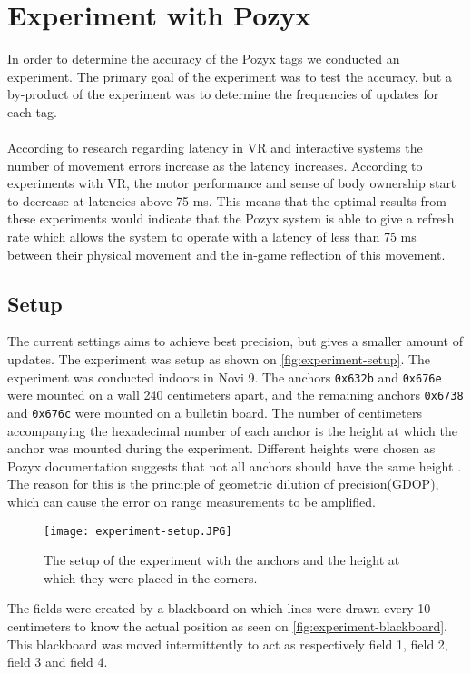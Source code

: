 \section{Experiment with Pozyx}
In order to determine the accuracy of the Pozyx tags we conducted an experiment.
The primary goal of the experiment was to test the accuracy, but a by-product of the experiment was to determine the frequencies of updates for each tag.
\\\\
According to research regarding latency in VR \cite{WaltemateThomas2016Tiol} and interactive systems \cite{10.1145/169059.169431} the number of movement errors increase as the latency increases.
According to experiments with VR, the motor performance and sense of body ownership start to decrease at latencies above 75 ms.
This means that the optimal results from these experiments would indicate that the Pozyx system is able to give a refresh rate which allows the system to operate with a latency of less than 75 ms between their physical movement and the in-game reflection of this movement.

\subsection{Setup}
The current settings aims to achieve best precision, but gives a smaller amount of updates.
The experiment was setup as shown on \autoref{fig:experiment-setup}. 
The experiment was conducted indoors in Novi 9. 
The anchors \texttt{0x632b} and \texttt{0x676e} were mounted on a wall 240 centimeters apart, and the remaining anchors \texttt{0x6738} and \texttt{0x676c} were mounted on a bulletin board.
The number of centimeters accompanying the hexadecimal number of each anchor is the height at which the anchor was mounted during the experiment.
Different heights were chosen as Pozyx documentation suggests that not all anchors should have the same height \cite{pozyx-AnchorHeights}.
The reason for this is the principle of geometric dilution of precision(GDOP), which can cause the error on range measurements to be amplified.

\begin{figure}[H]
    \centering
    \texttt{[image: experiment-setup.JPG]}
    \caption{The setup of the experiment with the anchors and the height at which they were placed in the corners.}
    \label{fig:experiment-setup}
\end{figure}
\noindent
The fields were created by a blackboard on which lines were drawn every 10 centimeters to know the actual position as seen on \autoref{fig:experiment-blackboard}.
This blackboard was moved intermittently to act as respectively field 1, field 2, field 3 and field 4.

